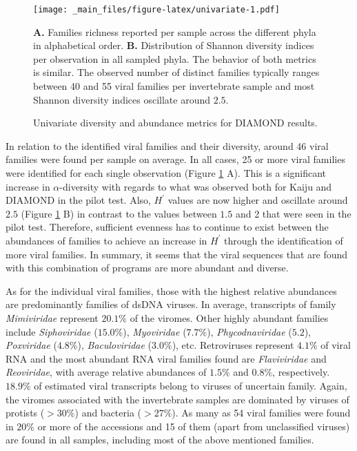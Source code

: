 \documentclass[
  openany]{book}
\begin{document}
\begin{figure}[!htbp]

\texttt{[image: \_main\_files/figure-latex/univariate-1.pdf]}

\caption{Univariate diversity and abundance metrics for DIAMOND results.\label{fig:defdmnddiver}}
\textbf{A.} Families richness reported per sample across the different phyla in alphabetical order. \textbf{B.} Distribution of Shannon diversity indices per observation in all sampled phyla. The behavior of both metrics is similar. The observed number of distinct families typically ranges between 40 and 55 viral families per invertebrate sample and most Shannon diversity indices oscillate around $2.5$.


\end{figure}

In relation to the identified viral families and their diversity, around 46 viral families were found per sample on average. In all cases, 25 or more viral families were identified for each single observation (Figure \ref{fig:defdmnddiver} A). This is a significant increase in \(\alpha\)-diversity with regards to what was observed both for Kaiju and DIAMOND in the pilot test. Also, \(H^\prime\) values are now higher and oscillate around \(2.5\) (Figure \ref{fig:defdmnddiver} B) in contrast to the values between \(1.5\) and 2 that were seen in the pilot test. Therefore, sufficient evenness has to continue to exist between the abundances of families to achieve an increase in \(H^\prime\) through the identification of more viral families. In summary, it seems that the viral sequences that are found with this combination of programs are more abundant and diverse.

As for the individual viral families, those with the highest relative abundances are predominantly families of dsDNA viruses. In average, transcripts of family \emph{Mimiviridae} represent \(20.1\%\) of the viromes. Other highly abundant families include \emph{Siphoviridae} (\(15.0\%\)), \emph{Myoviridae} (\(7.7\%\)), \emph{Phycodnaviridae} (\(5.2%
\)), \emph{Poxviridae} (\(4.8\%\)), \emph{Baculoviridae} (\(3.0\%\)), etc. Retroviruses represent \(4.1\%\) of viral RNA and the most abundant RNA viral families found are \emph{Flaviviridae} and \emph{Reoviridae}, with average relative abundances of \(1.5\%\) and \(0.8\%\), respectively. \(18.9\%\) of estimated viral transcripts belong to viruses of uncertain family. Again, the viromes associated with the invertebrate samples are dominated by viruses of protists (\(>30\%\)) and bacteria (\(>27\%\)). As many as 54 viral families were found in \(20\%\) or more of the accessions and 15 of them (apart from unclassified viruses) are found in all samples, including most of the above mentioned families.
\end{document}
